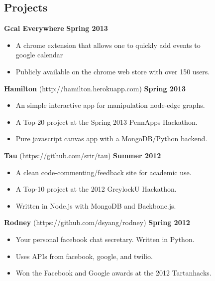 \documentclass[sectioned]{dsyangres}
\begin{document}
\begin{resume}
\section{Projects}

\textbf{Gcal Everywhere}
\hfill \textbf{Spring 2013}
  \begin{itemize} \itemsep -2pt
    \item A chrome extension that allows one to quickly add events to \\
      google calendar
    \item Publicly available on the chrome web store with over 150 users.
  \end{itemize}

\textbf{Hamilton} (http://hamilton.herokuapp.com)
\hfill \textbf{Spring 2013}
  \begin{itemize} \itemsep -2pt
    \item An simple interactive app for manipulation node-edge graphs.
    \item A Top-20 project at the Spring 2013 PennApps Hackathon.
    \item Pure javascript canvas app with a MongoDB/Python backend.
  \end{itemize}

\textbf{Tau} (https://github.com/srir/tau)
\hfill \textbf{Summer 2012}
  \begin{itemize} \itemsep -2pt
    \item A clean code-commenting/feedback site for academic use.
    \item A Top-10 project at the 2012 GreylockU Hackathon.
    \item Written in Node.js with MongoDB and Backbone.js.
  \end{itemize}

 \textbf{Rodney} (https://github.com/dsyang/rodney)
 \hfill \textbf{Spring 2012}
   \begin{itemize} \itemsep -2pt
     \item Your personal facebook chat secretary. Written in Python.
     \item Uses APIs from facebook, google, and twilio.
     \item Won the Facebook and Google awards at the 2012 Tartanhacks.
   \end{itemize}



\end{resume}
\end{document}
